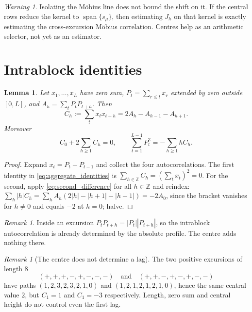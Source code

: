 \documentclass[11pt]{amsart}
\numberwithin{equation}{section}
\theoremstyle{plain}
\newtheorem{lemma}[theorem]{Lemma}
\theoremstyle{definition}
\theoremstyle{remark}
\newtheorem{remark}[theorem]{Remark}
\newtheorem{warning}[theorem]{Warning}
\begin{document}
\begin{warning}
\label{warn:isolating_is_not_bounding}
Isolating the M\"obius line does not bound the shift on it. If the
central rows reduce the kernel to $\operatorname{span}\{s_\mu\}$, then
estimating $J_h$ on that kernel is exactly estimating the
cross-excursion M\"obius correlation. Centres help as an arithmetic
selector, not yet as an estimator.
\end{warning}

\section{Intrablock identities}
\label{sec:intrablock}

\begin{lemma}
\label{lem:second_difference}
Let $x_1,\dots,x_L$ have zero sum, $P_t=\sum_{r\le t}x_r$ extended by
zero outside $[0,L]$, and $A_h=\sum_tP_tP_{t+h}$. Then
\begin{equation}
C_h:=\sum_tx_tx_{t+h}=2A_h-A_{h-1}-A_{h+1}.
\label{eq:second_difference}
\end{equation}
Moreover
\begin{equation}
C_0+2\sum_{h\ge1}C_h=0,
\qquad
\sum_{t=1}^{L-1}P_t^2=-\sum_{h\ge1}hC_h .
\label{eq:aggregate_identities}
\end{equation}
\end{lemma}

\begin{proof}
Expand $x_t=P_t-P_{t-1}$ and collect the four autocorrelations. The
first identity in \eqref{eq:aggregate_identities} is
$\sum_{h\in\mathbb Z}C_h=(\sum_tx_t)^2=0$. For the second, apply
\eqref{eq:second_difference} for all $h\in\mathbb Z$ and reindex:
$\sum_h|h|C_h=\sum_hA_h(2|h|-|h+1|-|h-1|)=-2A_0$, since the bracket
vanishes for $h\ne0$ and equals $-2$ at $h=0$; halve.
\end{proof}

\begin{remark}
\label{rem:intrablock_is_profile}
Inside an excursion $P_tP_{t+h}=|P_t||P_{t+h}|$, so the intrablock
autocorrelation is already determined by the absolute profile. The
centre adds nothing there.
\end{remark}

\begin{remark}[The centre does not determine a lag]
\label{rem:counterexample_lag}
The two positive excursions of length $8$
\begin{equation}
(+,+,+,-,+,-,-,-)\quad\text{and}\quad(+,+,-,+,-,+,-,-)
\label{eq:counterexample_words}
\end{equation}
have paths $(1,2,3,2,3,2,1,0)$ and $(1,2,1,2,1,2,1,0)$, hence the same
central value $2$, but $C_1=1$ and $C_1=-3$ respectively. Length, zero
sum and central height do not control even the first lag.
\end{remark}
\end{document}
